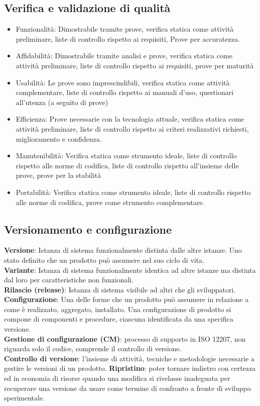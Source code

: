 \subsection{Verifica e validazione di qualità}
\begin{itemize}
\item Funzionalità: Dimostrabile tramite prove, verifica statica come attività preliminare, liste di controllo
rispetto ai requisiti, Prove per accuratezza.
\item Affidabilità: Dimostrabile tramite analisi e prove, verifica statica come attività preliminare, liste di controllo rispetto ai requisiti, prove per maturità
\item Usabilità: Le prove sono imprescindibili, verifica statica come attività complementare, liste di controllo rispetto ai manuali d'uso, questionari all'utenza (a seguito di prove)
\item Efficienza: Prove necessarie con la tecnologia attuale, verifica statica come attività preliminare, liste di controllo rispetto ai criteri realizzativi richiesti, miglioramento e confidenza.
\item Manutenibilità: Verifica statica come strumento ideale, liste di controllo rispetto alle norme di codifica, liste di controllo rispetto all'insieme delle prove, prove per la stabilità
\item Portabilità: Verifica statica come strumento ideale, liste di controllo rispetto alle norme di codifica, prove come strumento complementare.
\end{itemize}
\subsection{Versionamento e configurazione}
\textbf{Versione}: Istanza di sistema funzionalmente distinta dalle altre istanze. Uno stato definito che un prodotto può assumere nel suo ciclo di vita.\\
\textbf{Variante}: Istanza di sistema funzionalmente identica ad altre istanze ma distinta dal loro per caratteristiche non funzionali.\\
\textbf{Rilascio (release)}: Istanza di sistema visibile ad altri che gli sviluppatori.\\
\textbf{Configurazione}: Una delle forme che un prodotto può assumere in relazione a come è realizzato, aggregato, installato. Una configurazione di prodotto si compone di componenti e procedure, ciascuna identificata da una specifica versione.\\
\textbf{Gestione di configurazione (CM)}: processo di supporto in ISO 12207, non riguarda solo il codice, comprende il controllo di versione.\\
\textbf{Controllo di versione}: l'insieme di attività, tecniche e metodologie necessarie a gestire le versioni di un prodotto.
\textbf{Ripristino}: poter tornare indietro con certezza ed in economia di risorse quando una modifica si rivelasse inadeguata per recuperare una versione da usare come termine di confronto a fronte di sviluppo sperimentale.

